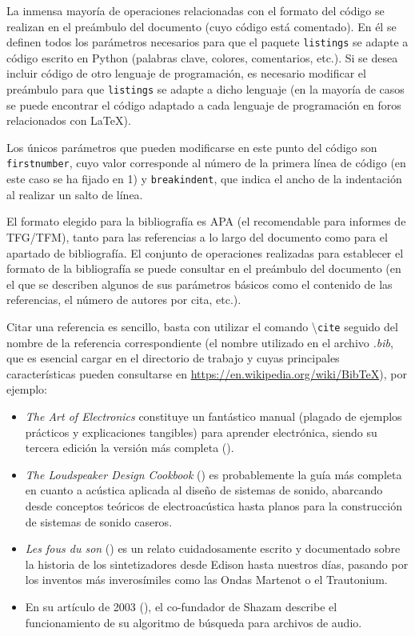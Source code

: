 \documentclass[a4paper, 11pt, spanish, twoside]{article}
\begin{document}
La inmensa mayoría de operaciones relacionadas con el formato del código se realizan en el preámbulo del documento (cuyo código está comentado). En él se definen todos los parámetros necesarios para que el paquete \texttt{listings} se adapte a código escrito en Python (palabras clave, colores, comentarios, etc.). Si se desea incluir código de otro lenguaje de programación, es necesario modificar el preámbulo para que \texttt{listings} se adapte a dicho lenguaje (en la mayoría de casos se puede encontrar el código adaptado a cada lenguaje de programación en foros relacionados con \LaTeX).

Los únicos parámetros que pueden modificarse en este punto del código son \texttt{firstnumber}, cuyo valor corresponde al número de la primera línea de código (en este caso se ha fijado en 1) y \texttt{breakindent}, que indica el ancho de la indentación al realizar un salto de línea.




\newpage

El formato elegido para la bibliografía es APA (el recomendable para informes de TFG/TFM), tanto para las referencias a lo largo del documento como para el apartado de bibliografía. El conjunto de operaciones realizadas para establecer el formato de la bibliografía se puede consultar en el preámbulo del documento (en el que se describen algunos de sus parámetros básicos como el contenido de las referencias, el número de autores por cita, etc.).

Citar una referencia es sencillo, basta con utilizar el comando \textbackslash\texttt{cite} seguido del nombre de la referencia correspondiente (el nombre utilizado en el archivo \textit{.bib}, que es esencial cargar en el directorio de trabajo y cuyas principales características pueden consultarse en \url{https://en.wikipedia.org/wiki/BibTeX}), por ejemplo:

\begin{itemize}
    \item \textit{The Art of Electronics} constituye un fantástico manual (plagado de ejemplos prácticos y explicaciones tangibles) para aprender electrónica, siendo su tercera edición la versión más completa (\cite{horowitz2015}).
    \item \textit{The Loudspeaker Design Cookbook} (\cite{dickson2007}) es probablemente la guía más completa en cuanto a acústica aplicada al diseño de sistemas de sonido, abarcando desde conceptos teóricos de electroacústica hasta planos para la construcción de sistemas de sonido caseros.
    \item \textit{Les fous du son} (\cite{dewilde2016}) es un relato cuidadosamente escrito y documentado sobre la historia de los sintetizadores desde Edison hasta nuestros días, pasando por los inventos más inverosímiles como las Ondas Martenot o el Trautonium.
    \item En su artículo de 2003 (\cite{wang2003}), el co-fundador de Shazam describe el funcionamiento de su algoritmo de búsqueda para archivos de audio.
\end{itemize}
\end{document}
